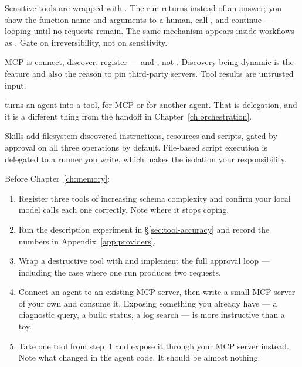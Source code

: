Sensitive tools are wrapped with . The run
returns  instead of an answer; you show the
function name and arguments to a human, call , and continue
--- looping until no requests remain. The same mechanism appears inside workflows
as . Gate on irreversibility, not on sensitivity.

MCP is connect, discover, register --- and , not .
Discovery being dynamic is the feature and also the reason to pin third-party
servers. Tool results are untrusted input.

 turns an agent into a tool, for MCP or for another agent. That
is delegation, and it is a different thing from the handoff in
Chapter~\ref{ch:orchestration}.

Skills add filesystem-discovered instructions, resources and scripts, gated by
approval on all three operations by default. File-based script execution is
delegated to a runner you write, which makes the isolation your responsibility.

\begin{exercisebox}
Before Chapter~\ref{ch:memory}:

\begin{enumerate}[leftmargin=1.4em]
\item Register three tools of increasing schema complexity and confirm your local
      model calls each one correctly. Note where it stops coping.
\item Run the description experiment in \S\ref{sec:tool-accuracy} and record the
      numbers in Appendix~\ref{app:providers}.
\item Wrap a destructive tool with  and implement
      the full approval loop --- including the case where one run produces two
      requests.
\item Connect an agent to an existing MCP server, then write a small MCP server of
      your own and consume it. Exposing something you already have --- a
      diagnostic query, a build status, a log search --- is more instructive than
      a toy.
\item Take one tool from step~1 and expose it through your MCP server instead.
      Note what changed in the agent code. It should be almost nothing.
\end{enumerate}
\end{exercisebox}
